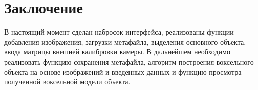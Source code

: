 \section*{Заключение}
В настоящий момент сделан набросок интерфейса, реализованы функции добавления изображения, загрузки метафайла, выделения основного объекта, ввода матрицы внешней калибровки камеры. В дальнейшем необходимо реализовать функцию сохранения метафайла, алгоритм построения воксельного объекта на основе изображений и введенных данных и функцию просмотра полученной воксельной модели объекта.

